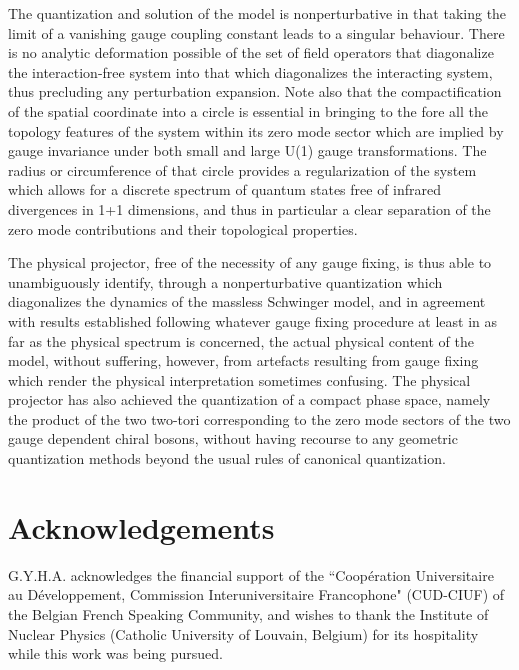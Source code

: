 \documentclass[a4paper,11pt]{article}
\begin{document}
The quantization and solution of the model is nonperturbative in that taking 
the limit of a vanishing gauge coupling constant \coordHE{} leads to a singular 
behaviour. There is no analytic deformation possible of the set of field 
operators that diagonalize the interaction-free system into that which 
dia\-go\-na\-li\-zes the interacting system, thus precluding any perturbation 
expansion. Note also that the compactification of the spatial coordinate into 
a circle is essential in bringing to the fore all the topology features
of the system within its zero mode sector which are implied by gauge
invariance under both small and large U(1) gauge transformations. The radius 
\coordHE{} or circumference \coordHE{} of that circle provides a regularization of the 
system which allows for a discrete spectrum of quantum states free of infrared
divergences in 1+1 dimensions, and thus in particular a clear separation
of the zero mode contributions and their topological properties.

The physical projector, free of the necessity of any gauge fixing,
is thus able to unambiguously identify, through a nonperturbative quantization
which diagonalizes the dynamics of the massless Schwinger model, and 
in agreement with results established following whatever gauge fixing 
procedure at least in as far as the physical spectrum is concerned, the actual 
physical content of the model, without suffering, however, from artefacts 
resulting from gauge fixing which render the physical interpretation 
sometimes confusing. The physical projector has also achieved the 
quantization of a compact phase space, namely the product of the two two-tori 
corresponding to the zero mode sectors of the two gauge dependent chiral 
bosons, without having recourse to any geometric quantization methods beyond 
the usual rules of canonical quantization.

\section*{Acknowledgements}

G.Y.H.A. acknowledges the financial support of the ``Coop\'eration
Universitaire au D\'evelop\-pe\-ment, Commission Interuniversitaire
Francophone" (CUD-CIUF) of the Belgian French Speaking Community, and wishes
to thank the Institute of Nuclear Physics (Catholic University
of Louvain, Belgium) for its hos\-pi\-ta\-li\-ty while this work was being
pursued. 
\end{document}
